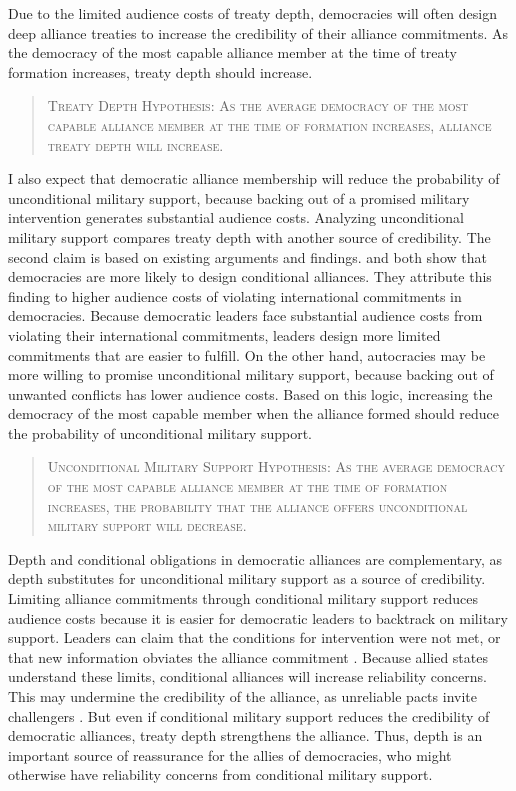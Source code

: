 \documentclass[12pt]{article}
\begin{document}
Due to the limited audience costs of treaty depth, democracies will often design deep alliance treaties to increase the credibility of their alliance commitments. 
As the democracy of the most capable alliance member at the time of treaty formation increases, treaty depth should increase. 


\begin{quote}
\textsc{Treaty Depth Hypothesis: As the average democracy of the most capable alliance member at the time of formation increases, alliance treaty depth will increase.}
\end{quote} 


I also expect that democratic alliance membership will reduce the probability of unconditional military support, because backing out of a promised military intervention generates substantial audience costs. 
Analyzing unconditional military support compares treaty depth with another source of credibility. 
The second claim is based on existing arguments and findings. 
\citet{Mattes2012} and \citet{Chibaetal2015} both show that democracies are more likely to design conditional alliances. 
They attribute this finding to higher audience costs of violating international commitments in democracies. 
Because democratic leaders face substantial audience costs from violating their international commitments, leaders design more limited commitments that are easier to fulfill. 
On the other hand, autocracies may be more willing to promise unconditional military support, because backing out of unwanted conflicts has lower audience costs. 
Based on this logic, increasing the democracy of the most capable member when the alliance formed should reduce the probability of unconditional military support.


\begin{quote}
\textsc{Unconditional Military Support Hypothesis: As the average democracy of the most capable alliance member at the time of formation increases, the probability that the alliance offers unconditional military support will decrease.}
\end{quote} 


Depth and conditional obligations in democratic alliances are complementary, as depth substitutes for unconditional military support as a source of credibility. 
Limiting alliance commitments through conditional military support reduces audience costs because it is easier for democratic leaders to backtrack on military support. 
Leaders can claim that the conditions for intervention were not met, or that new information obviates the alliance commitment \citep{LevenduskyHorowitz2012}. 
Because allied states understand these limits, conditional alliances will increase reliability concerns. 
This may undermine the credibility of the alliance, as unreliable pacts invite challengers \citep{Smith1995}. 
But even if conditional military support reduces the credibility of democratic alliances, treaty depth strengthens the alliance. 
Thus, depth is an important source of reassurance for the allies of democracies, who might otherwise have reliability concerns from conditional military support. 
\end{document}
